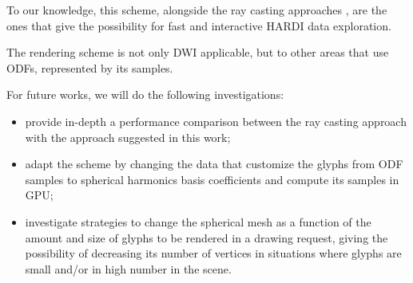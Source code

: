 \documentclass[twoside,twocolumn,10pt]{article}
\begin{document}
To our knowledge, this scheme, alongside the ray casting approaches \cite{peeters2009,almsick2011}, are the ones that give the possibility for fast and interactive HARDI data exploration.

The rendering scheme is not only DWI applicable, but to other areas that use ODFs, represented by its samples.



For future works, we will do the following investigations:
\begin{itemize}
\item provide in-depth a performance comparison between the ray casting approach with the approach suggested in this work;
\item adapt the scheme by changing the data that customize the glyphs from ODF samples to spherical harmonics basis coefficients and compute its samples in GPU;
\item investigate strategies to change the spherical mesh as a function of the amount and size of glyphs to be rendered in a drawing request, giving the possibility of decreasing its number of vertices in situations where glyphs are small and/or in high number in the scene.
\end{itemize}








\end{document}
